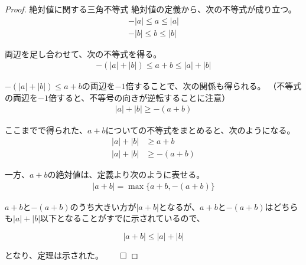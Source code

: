 \documentclass[../../imaging-math]{subfiles}
\begin{document}
\begin{proof}{絶対値に関する三角不等式}
  絶対値の定義から、次の不等式が成り立つ。
  \begin{align}
    -|a| \leq a \leq |a| \\
    -|b| \leq b \leq |b|
  \end{align}

  両辺を足し合わせて、次の不等式を得る。
  \begin{align}
    -(|a| + |b|) \leq a + b \leq |a| + |b|
  \end{align}

  $-(|a| + |b|) \leq a + b$の両辺を$-1$倍することで、次の関係も得られる。
  （不等式の両辺を$-1$倍すると、不等号の向きが逆転することに注意）
  \begin{align}
    |a| + |b| \geq -(a + b)
  \end{align}

  ここまでで得られた、$a+b$についての不等式をまとめると、次のようになる。
  \begin{align}
    |a| + |b| & \geq a+b      \\
    |a| + |b| & \geq -(a + b)
  \end{align}

  一方、$a+b$の絶対値は、定義より次のように表せる。
  \begin{align}
    |a + b| = \max\{a + b, -(a + b)\}
  \end{align}

  $a+b$と$-(a+b)$のうち大きい方が$|a+b|$となるが、$a + b$と$-(a+b)$はどちらも$|a| + |b|$以下となることがすでに示されているので、

  \begin{equation}
    |a + b| \leq |a| + |b|
  \end{equation}

  となり、定理は示された。$\qed$
\end{proof}
\end{document}
